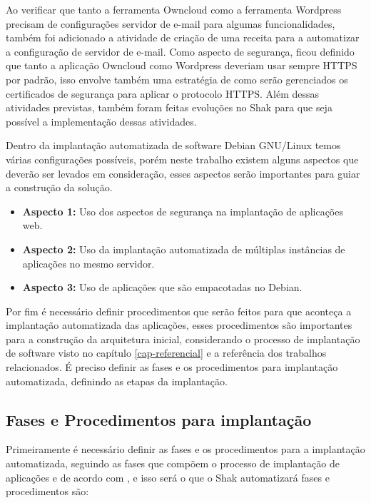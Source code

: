 Ao verificar que tanto a ferramenta Owncloud como a ferramenta Wordpress precisam
de configurações servidor de e-mail para algumas funcionalidades, também foi adicionado
a atividade de criação de uma receita para a automatizar a configuração de
servidor de e-mail. Como aspecto de segurança, ficou definido que tanto a aplicação
Owncloud como Wordpress deveriam usar sempre HTTPS por padrão, isso envolve também
uma estratégia de como serão gerenciados os certificados de segurança para aplicar
o protocolo HTTPS. Além dessas atividades previstas, também foram feitas evoluções
no Shak para que seja possível a implementação dessas atividades. 

Dentro da implantação automatizada de software Debian GNU/Linux temos várias
configurações possíveis, porém neste trabalho existem alguns aspectos que deverão ser levados em
consideração, esses aspectos serão importantes para guiar a construção da solução.

\begin{itemize}
  \item  \textbf{Aspecto 1:} Uso dos aspectos de segurança na implantação de aplicações web.
  \item  \textbf{Aspecto 2:} Uso da implantação automatizada de múltiplas instâncias de
   aplicações no mesmo servidor.
  \item  \textbf{Aspecto 3:} Uso de aplicações que são empacotadas no Debian.
\end{itemize}

Por fim é necessário definir procedimentos que serão
feitos para que aconteça a implantação automatizada das aplicações, esses procedimentos são
importantes para a construção da arquitetura inicial, considerando
o processo de implantação de software visto no capítulo \ref{cap-referencial}
e a referência dos trabalhos relacionados. É preciso definir as fases e os 
procedimentos para implantação automatizada, definindo as etapas 
da implantação.

\subsection{Fases e Procedimentos para implantação}

Primeiramente é necessário definir as fases e os procedimentos para a implantação automatizada,
seguindo as fases que compõem o processo de implantação de aplicações e de acordo
com \cite{omg2006}, e isso será o que o Shak automatizará fases e procedimentos são:

